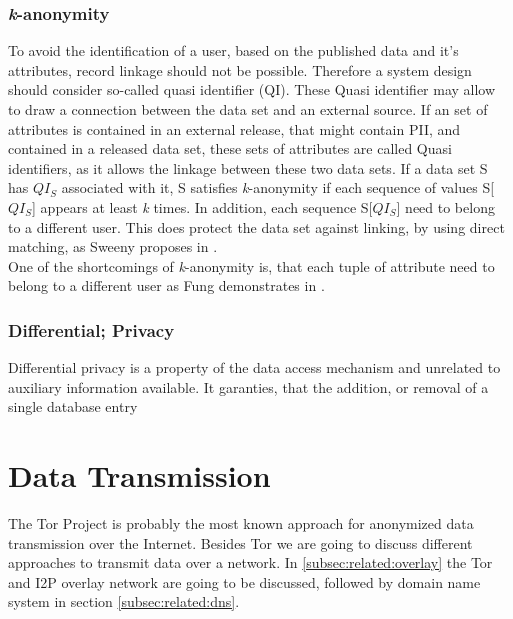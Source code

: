         \subsubsection{\textit{k}-anonymity}
            \label{subsec:related:kanon}
            To avoid the identification of a user, based on the published data and it's attributes, record linkage should not be possible. Therefore a system design should consider so-called quasi identifier (QI). These Quasi identifier may allow to draw a connection between the data set and an external source\cite{sweeney_k-anonymity_2002}.
            If an set of attributes is contained in an external release, that might contain PII, and contained in a released data set, these sets of attributes are called Quasi identifiers, as it allows the linkage between these two data sets.
            If a data set S has $QI_S$ associated with it, S satisfies \textit{k}-anonymity if each sequence of values S[$QI_S$] appears at least \textit{k} times. 
        	In addition, each sequence S[$QI_S$] need to belong to a different user.
        	This does protect the data set against linking, by using direct matching, as Sweeny proposes in \cite{sweeney_k-anonymity_2002}.\\
            
            One of the shortcomings of \textit{k}-anonymity is, that each tuple of attribute need to belong to a different user as Fung demonstrates in \cite{fung_introduction_2011}.

        \subsubsection{Differential; Privacy}
            \label{subsec:related:dif_privacy}
            Differential privacy is a property of the data access mechanism and unrelated to auxiliary information available\cite{dwork_algorithmic_2013}. 
            It garanties, that the addition, or removal of a single database entry
            \cite{agrawal_differential_2008}
\section{Data Transmission}
    \label{sec:related:data_transmission}
    The Tor Project is probably the most known approach for anonymized data transmission over the Internet. Besides Tor we are going to discuss different approaches to transmit data over a network. In \ref{subsec:related:overlay} the Tor and I2P overlay network are going to be discussed, followed by domain name system in section \ref{subsec:related:dns}. 
        

